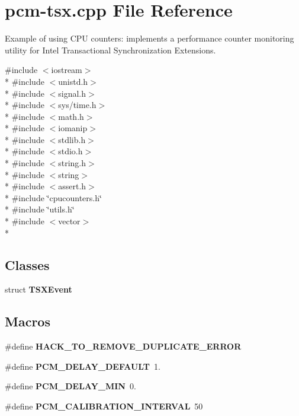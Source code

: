 \section{pcm-\/tsx.cpp File Reference}
\label{pcm-tsx_8cpp}


Example of using C\+PU counters\+: implements a performance counter monitoring utility for Intel Transactional Synchronization Extensions.  


{\ttfamily \#include $<$iostream$>$}\\*
{\ttfamily \#include $<$unistd.\+h$>$}\\*
{\ttfamily \#include $<$signal.\+h$>$}\\*
{\ttfamily \#include $<$sys/time.\+h$>$}\\*
{\ttfamily \#include $<$math.\+h$>$}\\*
{\ttfamily \#include $<$iomanip$>$}\\*
{\ttfamily \#include $<$stdlib.\+h$>$}\\*
{\ttfamily \#include $<$stdio.\+h$>$}\\*
{\ttfamily \#include $<$string.\+h$>$}\\*
{\ttfamily \#include $<$string$>$}\\*
{\ttfamily \#include $<$assert.\+h$>$}\\*
{\ttfamily \#include \char`\"{}cpucounters.\+h\char`\"{}}\\*
{\ttfamily \#include \char`\"{}utils.\+h\char`\"{}}\\*
{\ttfamily \#include $<$vector$>$}\\*
\subsection*{Classes}
\begin{DoxyCompactItemize}
\item 
struct {\bf T\+S\+X\+Event}
\end{DoxyCompactItemize}
\subsection*{Macros}
\begin{DoxyCompactItemize}
\item 
\#define {\bfseries H\+A\+C\+K\+\_\+\+T\+O\+\_\+\+R\+E\+M\+O\+V\+E\+\_\+\+D\+U\+P\+L\+I\+C\+A\+T\+E\+\_\+\+E\+R\+R\+OR}\label{pcm-tsx_8cpp_ac4eeb11d89b0f517835a12a04443ebe4}

\item 
\#define {\bfseries P\+C\+M\+\_\+\+D\+E\+L\+A\+Y\+\_\+\+D\+E\+F\+A\+U\+LT}~1.\label{pcm-tsx_8cpp_aa9ecc55c90c7a69729babc4f5f91ed96}

\item 
\#define {\bfseries P\+C\+M\+\_\+\+D\+E\+L\+A\+Y\+\_\+\+M\+IN}~0.\label{pcm-tsx_8cpp_acccbe8441d6dd75bdc949f5f0ee126c5}

\item 
\#define {\bfseries P\+C\+M\+\_\+\+C\+A\+L\+I\+B\+R\+A\+T\+I\+O\+N\+\_\+\+I\+N\+T\+E\+R\+V\+AL}~50\label{pcm-tsx_8cpp_a433dde946b6713059756318598c9a6fe}

\end{DoxyCompactItemize}
